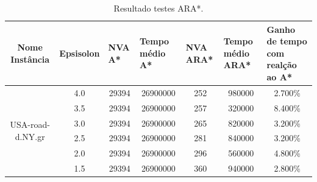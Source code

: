 \begin{table}[H]
\caption{Resultado testes ARA*.}
\label{tbl-experimentos-dinamicos-ara}
\centering
\begin{adjustbox}{max width=\textwidth}
\begin{tabular}{|c|c|c|c|c|c|c|}
\hline
\textbf{Nome Instância}            & \multicolumn{1}{l|}{\textbf{Epsisolon}} & \multicolumn{1}{l|}{\textbf{NVA A*}} & \multicolumn{1}{l|}{\textbf{Tempo médio A*}} & \multicolumn{1}{l|}{\textbf{NVA ARA*}} & \multicolumn{1}{l|}{\textbf{Tempo médio ARA*}} & \multicolumn{1}{l|}{\textbf{Ganho de tempo com realção ao A*}} \\ \hline
\multirow{7}{*}{USA-road-d.NY.gr}  & 4.0                                     & 29394                                & 26900000                                     & 252                                    & 980000                                         & 2.700\%                                                        \\ \cline{2-7} 
                                   & 3.5                                     & 29394                                & 26900000                                     & 257                                    & 320000                                         & 8.400\%                                                        \\ \cline{2-7} 
                                   & 3.0                                     & 29394                                & 26900000                                     & 265                                    & 820000                                         & 3.200\%                                                        \\ \cline{2-7} 
                                   & 2.5                                     & 29394                                & 26900000                                     & 281                                    & 840000                                         & 3.200\%                                                        \\ \cline{2-7} 
                                   & 2.0                                     & 29394                                & 26900000                                     & 296                                    & 560000                                         & 4.800\%                                                        \\ \cline{2-7} 
                                   & 1.5                                     & 29394                                & 26900000                                     & 360                                    & 940000                                         & 2.800\%                                                        \\ \cline{2-7} 

\end{tabular}
\end{adjustbox}
\end{table}
